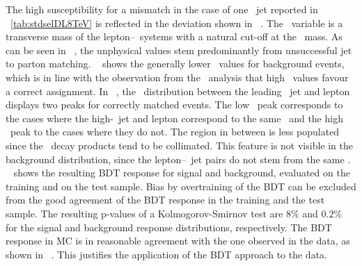 %
The high susceptibility for a mismatch in the case of one \btagged\ jet reported in \tab~\ref{tab:stdselDL8TeV} is reflected in the deviation shown in \fig~.
%
%
%
The \mttwo\ variable is a transverse mass of the lepton--\bjet\ systems with a natural cut-off at the \tquark\ mass. As can be seen in \fig~, the unphysical values stem predominantly from unsuccessful jet to parton matching. \Fig~ shows the generally lower \ptlb\ values for background events, which is in line with the observation from the \cutbased\ analysis that high \ptlb\ values favour a correct assignment. In \fig~, the \dR\ distribution between the leading \pt\ jet and lepton displays two peaks for correctly matched events. The low \dR\ peak corresponds to the cases where the high-\pt\ jet and lepton correspond to the same \tquark\ and the high \dR\ peak to the cases where they do not. The region in between is less populated since the \tquark\ decay products tend to be collimated. This feature is not visible in the background distribution, since the lepton--\btagged\ jet pairs do not stem from the same \tquark. \Fig~ shows the resulting \gls{BDT} response for signal and background, evaluated on the training and on the test sample.
%
Bias by overtraining of the \gls{BDT} can be excluded from the good agreement of the \gls{BDT} response in the training and the test sample. The resulting p-values of a Kolmogorov-Smirnov test are $8\%$ and $0.2\%$ for the signal and background response distributions, respectively.
%
The \gls{BDT} response in \gls{MC} is in reasonable agreement with the one observed in the data, as shown in \fig~. 
%
This justifies the application of the \gls{BDT} approach to the data.


